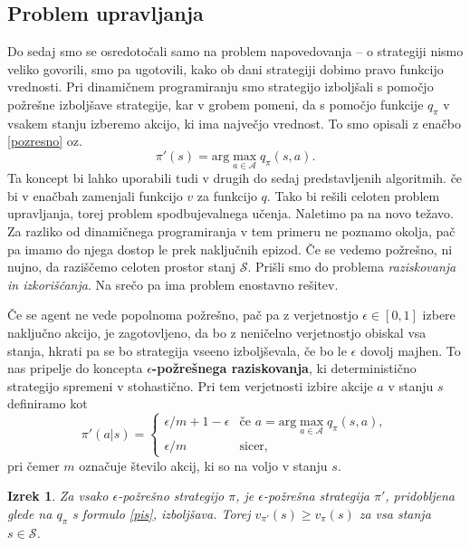\documentclass[12pt,a4paper]{amsart}
\theoremstyle{definition} %
\theoremstyle{plain} %
\newtheorem{izrek}[definicija]{Izrek}
\begin{document}
\subsection{Problem upravljanja}
Do sedaj smo se osredotočali samo na problem napovedovanja -- o strategiji nismo veliko govorili, 
smo pa ugotovili, kako ob dani strategiji dobimo pravo funkcijo vrednosti. Pri dinamičnem 
programiranju smo strategijo izboljšali s pomočjo požrešne izboljšave strategije, kar v grobem pomeni, 
da s pomočjo funkcije $q_\pi$ v vsakem stanju izberemo akcijo, ki ima največjo vrednost. To smo opisali 
z enačbo \eqref{pozresno} oz.
$$
\pi'(s) = \text{arg}\max_{a \in \mathcal{A}} q_\pi(s, a).
$$
Ta koncept bi lahko uporabili tudi v drugih do sedaj predstavljenih algoritmih. če bi v enačbah zamenjali 
funkcijo $v$ za funkcijo $q$. Tako bi rešili celoten problem upravljanja, torej problem spodbujevalnega 
učenja. Naletimo pa na novo težavo. Za razliko od dinamičnega programiranja v tem primeru ne poznamo 
okolja, pač pa imamo do njega dostop le prek naključnih epizod. Če se vedemo požrešno, ni nujno, 
da raziščemo celoten prostor stanj $\mathcal{S}$. Prišli smo do problema \textit{raziskovanja in 
izkoriščanja}. Na srečo pa ima problem enostavno rešitev.

Če se agent ne vede popolnoma požrešno, pač pa z verjetnostjo $\epsilon \in [0, 1]$ izbere naključno akcijo, 
je zagotovljeno, da bo z neničelno verjetnostjo obiskal vsa stanja, hkrati pa se bo strategija 
vseeno izboljševala, če bo le $\epsilon$ dovolj majhen. To nas pripelje do koncepta \textbf{
$\epsilon$-požrešnega raziskovanja}, ki deterministično strategijo spremeni v stohastično. Pri tem 
verjetnosti izbire akcije $a$ v stanju $s$ definiramo kot
\begin{equation}\label{pis}
    \pi'(a|s) = \begin{cases}
                \epsilon / m + 1 - \epsilon & \text{če } a = \text{arg}\max_{a \in 
                    \mathcal{A}} q_\pi(s, a), \\
                    \epsilon / m & \text{sicer},
               \end{cases}
\end{equation}
pri čemer $m$ označuje število akcij, ki so na voljo v stanju $s$.

\begin{izrek}
    Za vsako $\epsilon$-požrešno strategijo $\pi$, je $\epsilon$-požrešna strategija $\pi'$, 
    pridobljena glede na $q_\pi$ s formulo \eqref{pis}, izboljšava. Torej $v_{\pi'}(s) \geq v_\pi(s)$ 
    za vsa stanja $s \in \mathcal{S}$.
\end{izrek}
\end{document}
